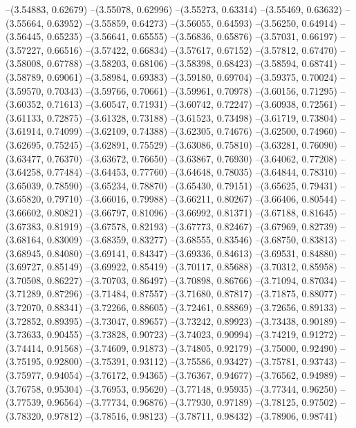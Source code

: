 --(3.54883, 0.62679)
--(3.55078, 0.62996)
--(3.55273, 0.63314)
--(3.55469, 0.63632)
--(3.55664, 0.63952)
--(3.55859, 0.64273)
--(3.56055, 0.64593)
--(3.56250, 0.64914)
--(3.56445, 0.65235)
--(3.56641, 0.65555)
--(3.56836, 0.65876)
--(3.57031, 0.66197)
--(3.57227, 0.66516)
--(3.57422, 0.66834)
--(3.57617, 0.67152)
--(3.57812, 0.67470)
--(3.58008, 0.67788)
--(3.58203, 0.68106)
--(3.58398, 0.68423)
--(3.58594, 0.68741)
--(3.58789, 0.69061)
--(3.58984, 0.69383)
--(3.59180, 0.69704)
--(3.59375, 0.70024)
--(3.59570, 0.70343)
--(3.59766, 0.70661)
--(3.59961, 0.70978)
--(3.60156, 0.71295)
--(3.60352, 0.71613)
--(3.60547, 0.71931)
--(3.60742, 0.72247)
--(3.60938, 0.72561)
--(3.61133, 0.72875)
--(3.61328, 0.73188)
--(3.61523, 0.73498)
--(3.61719, 0.73804)
--(3.61914, 0.74099)
--(3.62109, 0.74388)
--(3.62305, 0.74676)
--(3.62500, 0.74960)
--(3.62695, 0.75245)
--(3.62891, 0.75529)
--(3.63086, 0.75810)
--(3.63281, 0.76090)
--(3.63477, 0.76370)
--(3.63672, 0.76650)
--(3.63867, 0.76930)
--(3.64062, 0.77208)
--(3.64258, 0.77484)
--(3.64453, 0.77760)
--(3.64648, 0.78035)
--(3.64844, 0.78310)
--(3.65039, 0.78590)
--(3.65234, 0.78870)
--(3.65430, 0.79151)
--(3.65625, 0.79431)
--(3.65820, 0.79710)
--(3.66016, 0.79988)
--(3.66211, 0.80267)
--(3.66406, 0.80544)
--(3.66602, 0.80821)
--(3.66797, 0.81096)
--(3.66992, 0.81371)
--(3.67188, 0.81645)
--(3.67383, 0.81919)
--(3.67578, 0.82193)
--(3.67773, 0.82467)
--(3.67969, 0.82739)
--(3.68164, 0.83009)
--(3.68359, 0.83277)
--(3.68555, 0.83546)
--(3.68750, 0.83813)
--(3.68945, 0.84080)
--(3.69141, 0.84347)
--(3.69336, 0.84613)
--(3.69531, 0.84880)
--(3.69727, 0.85149)
--(3.69922, 0.85419)
--(3.70117, 0.85688)
--(3.70312, 0.85958)
--(3.70508, 0.86227)
--(3.70703, 0.86497)
--(3.70898, 0.86766)
--(3.71094, 0.87034)
--(3.71289, 0.87296)
--(3.71484, 0.87557)
--(3.71680, 0.87817)
--(3.71875, 0.88077)
--(3.72070, 0.88341)
--(3.72266, 0.88605)
--(3.72461, 0.88869)
--(3.72656, 0.89133)
--(3.72852, 0.89395)
--(3.73047, 0.89657)
--(3.73242, 0.89923)
--(3.73438, 0.90189)
--(3.73633, 0.90455)
--(3.73828, 0.90723)
--(3.74023, 0.90994)
--(3.74219, 0.91272)
--(3.74414, 0.91568)
--(3.74609, 0.91873)
--(3.74805, 0.92179)
--(3.75000, 0.92490)
--(3.75195, 0.92800)
--(3.75391, 0.93112)
--(3.75586, 0.93427)
--(3.75781, 0.93743)
--(3.75977, 0.94054)
--(3.76172, 0.94365)
--(3.76367, 0.94677)
--(3.76562, 0.94989)
--(3.76758, 0.95304)
--(3.76953, 0.95620)
--(3.77148, 0.95935)
--(3.77344, 0.96250)
--(3.77539, 0.96564)
--(3.77734, 0.96876)
--(3.77930, 0.97189)
--(3.78125, 0.97502)
--(3.78320, 0.97812)
--(3.78516, 0.98123)
--(3.78711, 0.98432)
--(3.78906, 0.98741)
